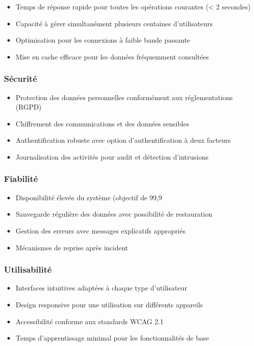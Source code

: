 \begin{itemize}
  \item Temps de réponse rapide pour toutes les opérations courantes (< 2 secondes)
  \item Capacité à gérer simultanément plusieurs centaines d'utilisateurs
  \item Optimisation pour les connexions à faible bande passante
  \item Mise en cache efficace pour les données fréquemment consultées
\end{itemize}

\subsubsection{Sécurité}

\begin{itemize}
  \item Protection des données personnelles conformément aux réglementations (RGPD)
  \item Chiffrement des communications et des données sensibles
  \item Authentification robuste avec option d'authentification à deux facteurs
  \item Journalisation des activités pour audit et détection d'intrusions
\end{itemize}

\subsubsection{Fiabilité}

\begin{itemize}
  \item Disponibilité élevée du système (objectif de 99,9%
  \item Sauvegarde régulière des données avec possibilité de restauration
  \item Gestion des erreurs avec messages explicatifs appropriés
  \item Mécanismes de reprise après incident
\end{itemize}

\subsubsection{Utilisabilité}

\begin{itemize}
  \item Interfaces intuitives adaptées à chaque type d'utilisateur
  \item Design responsive pour une utilisation sur différents appareils
  \item Accessibilité conforme aux standards WCAG 2.1
  \item Temps d'apprentissage minimal pour les fonctionnalités de base
\end{itemize}

